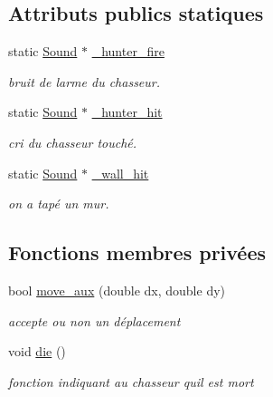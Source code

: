 \subsection*{Attributs publics statiques}
\begin{DoxyCompactItemize}
\item 
static \hyperlink{classSound}{Sound} $\ast$ \hyperlink{classChasseur_aec2e8b81e3f949dc7840bfcab9c3799a}{\+\_\+hunter\+\_\+fire}
\begin{DoxyCompactList}\small\item\em bruit de l\textquotesingle{}arme du chasseur. \end{DoxyCompactList}\item 
static \hyperlink{classSound}{Sound} $\ast$ \hyperlink{classChasseur_ab468d04c50ea338d604e87d5f6db3801}{\+\_\+hunter\+\_\+hit}
\begin{DoxyCompactList}\small\item\em cri du chasseur touché. \end{DoxyCompactList}\item 
static \hyperlink{classSound}{Sound} $\ast$ \hyperlink{classChasseur_a936a0739b4a010ee72191b65b908822a}{\+\_\+wall\+\_\+hit}
\begin{DoxyCompactList}\small\item\em on a tapé un mur. \end{DoxyCompactList}\end{DoxyCompactItemize}
\subsection*{Fonctions membres privées}
\begin{DoxyCompactItemize}
\item 
bool \hyperlink{classChasseur_aa6379811f429b4a20c60081493f1ee01}{move\+\_\+aux} (double dx, double dy)
\begin{DoxyCompactList}\small\item\em accepte ou non un déplacement \end{DoxyCompactList}\item 
void \hyperlink{classChasseur_ad618f782898a99810dae7ad8ee2c2f74}{die} ()
\begin{DoxyCompactList}\small\item\em fonction indiquant au chasseur qu\textquotesingle{}il est mort \end{DoxyCompactList}\end{DoxyCompactItemize}
